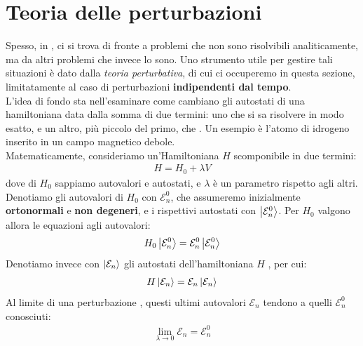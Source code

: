\documentclass[../../FisicaTeorica.tex]{subfiles}
\begin{document}

\section{Teoria delle perturbazioni}
Spesso, in \MQ, ci si trova di fronte a problemi che non sono risolvibili analiticamente, ma  da altri problemi che invece lo sono. Uno strumento utile per gestire tali situazioni è dato dalla \textit{teoria perturbativa}, di cui ci occuperemo in questa sezione, limitatamente al caso di perturbazioni \textbf{indipendenti dal tempo}.\\

L'idea di fondo sta nell'esaminare come cambiano gli autostati di una hamiltoniana data dalla somma di due termini: uno che si sa risolvere in modo esatto, e un altro, più piccolo del primo, che . Un esempio è l'atomo di idrogeno inserito in un campo magnetico debole.\\

Matematicamente, consideriamo un'Hamiltoniana $H$ scomponibile in due termini:
\begin{align}
H = H_0 + \lambda V
\label{eqn:hamiltoniana_perturbata}
\end{align}
dove di $H_0$ sappiamo autovalori e autostati, e $\lambda$ è un parametro  rispetto agli altri.\\
Denotiamo gli autovalori di $H_0$ con $\mathcal{E}^0_n$, che assumeremo inizialmente \textbf{ortonormali} e \textbf{non degeneri}, e i rispettivi autostati con $\Ket{\mathcal{E}^0_n}$. Per $H_0$ valgono allora le equazioni agli autovalori:
\begin{align*}
H_0 \Ket{\mathcal{E}^0_n} = \mathcal{E}^0_n \Ket{\mathcal{E}^0_n}
\end{align*}
Denotiamo invece con $\Ket{\mathcal{E}_n}$ gli autostati dell'hamiltoniana $H$ , per cui:
\begin{align*}
H\Ket{\mathcal{E}_n} = \mathcal{E}_n \Ket{\mathcal{E}_n}
\end{align*}
Al limite di una perturbazione , questi ultimi autovalori $\mathcal{E}_n$ tendono a quelli $\mathcal{E}_n^0$ conosciuti:\begin{align*}
\lim_{\lambda \to 0} \mathcal{E}_n = \mathcal{E}^0_n
\end{align*}
\end{document}
